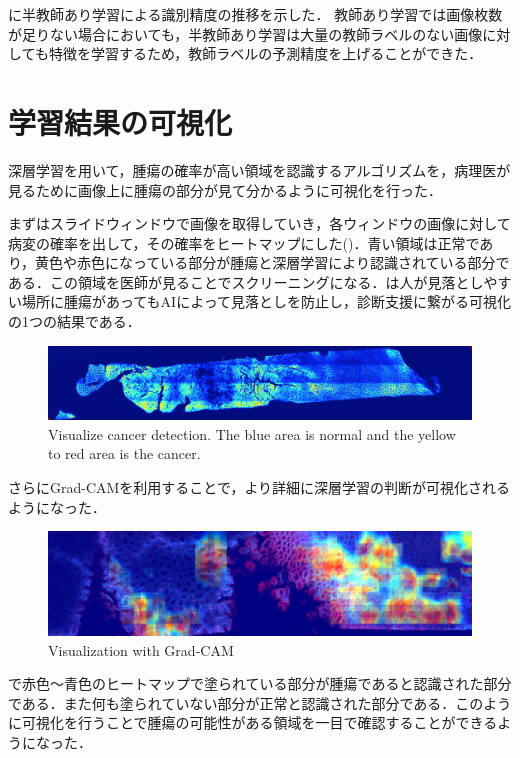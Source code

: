 に半教師あり学習による識別精度の推移を示した．
教師あり学習では画像枚数が足りない場合においても，半教師あり学習は大量の教師ラベルのない画像に対しても特徴を学習するため，教師ラベルの予測精度を上げることができた．


\section{学習結果の可視化}
深層学習を用いて，腫瘍の確率が高い領域を認識するアルゴリズムを，病理医が見るために画像上に腫瘍の部分が見て分かるように可視化を行った．

まずはスライドウィンドウで画像を取得していき，各ウィンドウの画像に対して病変の確率を出して，その確率をヒートマップにした()．青い領域は正常であり，黄色や赤色になっている部分が腫瘍と深層学習により認識されている部分である．この領域を医師が見ることでスクリーニングになる．は人が見落としやすい場所に腫瘍があってもAIによって見落としを防止し，診断支援に繋がる可視化の1つの結果である．

\begin{figure}[H]
	\centering
	\includegraphics[width=\linewidth]{fig/chapter4/visualization/sample_B}
	\caption{Visualize cancer detection. The blue area is normal and the yellow to red area is the cancer.}
	\label{fig:cancer_detect_sampleB}
\end{figure}

さらにGrad-CAMを利用することで，より詳細に深層学習の判断が可視化されるようになった．

\begin{figure}[H]
	\centering
	\includegraphics[width=\linewidth]{fig/chapter4/large-grad-cam-step100-rm-black}
	\caption{Visualization with Grad-CAM}
	\label{fig:large-grad}
\end{figure}

で赤色〜青色のヒートマップで塗られている部分が腫瘍であると認識された部分である．また何も塗られていない部分が正常と認識された部分である．このように可視化を行うことで腫瘍の可能性がある領域を一目で確認することができるようになった．